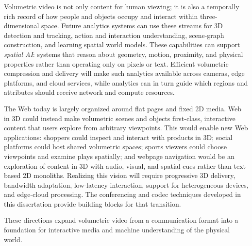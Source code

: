 %
Volumetric video is not only content for human viewing; it is also a temporally rich record of how people and objects occupy and interact within three-dimensional space. 
%
Future analytics systems can use these streams for 3D detection and tracking, action and interaction understanding, scene-graph construction, and learning spatial world models. 
%
These capabilities can support \textit{spatial AI}: systems that reason about geometry, motion, proximity, and physical properties rather than operating only on pixels or text.
%
Efficient volumetric compression and delivery will make such analytics available across cameras, edge platforms, and cloud services, while analytics can in turn guide which regions and attributes should receive network and compute resources.

%
The Web today is largely organized around flat pages and fixed 2D media. 
%
Web in 3D could instead make volumetric scenes and objects first-class, interactive content that users explore from arbitrary viewpoints. 
%
This would enable new Web applications: shoppers could inspect and interact with products in 3D; social platforms could host shared volumetric spaces; sports viewers could choose viewpoints and examine plays spatially; and webpage navigation would be an exploration of content in 3D with audio, visual, and spatial cues rather than text-based 2D monoliths. 
%
Realizing this vision will require progressive 3D delivery, bandwidth adaptation, low-latency interaction, support for heterogeneous devices, and edge-cloud processing. 
%
The conferencing and codec techniques developed in this dissertation provide building blocks for that transition.

These directions expand volumetric video from a communication format into a foundation for interactive media and machine understanding of the physical world.